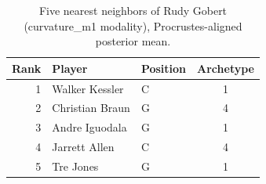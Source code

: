 \begin{table}[htbp]
  \centering\small
  \begin{tabular}{rllc}
    \toprule
    Rank & Player & Position & Archetype \\
    \midrule
    1 & Walker Kessler & C & 1 \\
    2 & Christian Braun & G & 4 \\
    3 & Andre Iguodala & G & 1 \\
    4 & Jarrett Allen & C & 4 \\
    5 & Tre Jones & G & 1 \\
    \bottomrule
  \end{tabular}
  \caption{Five nearest neighbors of Rudy Gobert (curvature_m1 modality), Procrustes-aligned posterior mean.}
  \label{tab:Rudy_Gobert_neighbors_curvature_m1}
\end{table}

